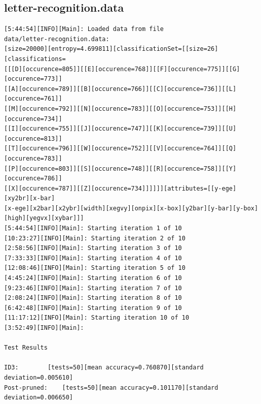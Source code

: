 \documentclass[10pt]{report}
\begin{document}
\subsection*{letter-recognition.data}
{\small
\begin{verbatim}
[5:44:54][INFO][Main]: Loaded data from file
data/letter-recognition.data:
[size=20000][entropy=4.699811][classificationSet=[[size=26][classifications=
[[[D][occurence=805]][[E][occurence=768]][[F][occurence=775]][[G][occurence=773]]
[[A][occurence=789]][[B][occurence=766]][[C][occurence=736]][[L][occurence=761]]
[[M][occurence=792]][[N][occurence=783]][[O][occurence=753]][[H][occurence=734]]
[[I][occurence=755]][[J][occurence=747]][[K][occurence=739]][[U][occurence=813]]
[[T][occurence=796]][[W][occurence=752]][[V][occurence=764]][[Q][occurence=783]]
[[P][occurence=803]][[S][occurence=748]][[R][occurence=758]][[Y][occurence=786]]
[[X][occurence=787]][[Z][occurence=734]]]]]][attributes=[[y-ege][xy2br][x-bar]
[x-ege][x2bar][x2ybr][width][xegvy][onpix][x-box][y2bar][y-bar][y-box][high][yegvx][xybar]]]  
[5:44:54][INFO][Main]: Starting iteration 1 of 10 
[10:23:27][INFO][Main]: Starting iteration 2 of 10 
[2:58:56][INFO][Main]: Starting iteration 3 of 10 
[7:33:33][INFO][Main]: Starting iteration 4 of 10 
[12:08:46][INFO][Main]: Starting iteration 5 of 10 
[4:45:24][INFO][Main]: Starting iteration 6 of 10 
[9:23:46][INFO][Main]: Starting iteration 7 of 10 
[2:08:24][INFO][Main]: Starting iteration 8 of 10 
[6:42:48][INFO][Main]: Starting iteration 9 of 10 
[11:17:12][INFO][Main]: Starting iteration 10 of 10 
[3:52:49][INFO][Main]: 

Test Results

ID3:		[tests=50][mean accuracy=0.760870][standard deviation=0.005610]
Post-pruned:	[tests=50][mean accuracy=0.101170][standard deviation=0.006650] 
\end{verbatim}
}
\end{document}
